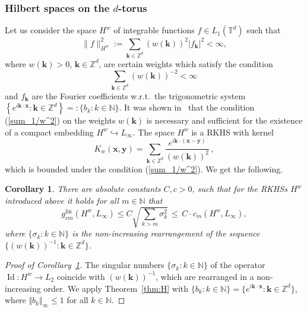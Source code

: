 \documentclass[a4paper,12pt]{amsart}
\newtheorem{corollary}[theorem]{Corollary}
\theoremstyle{definition}
\theoremstyle{remark}
\newcommand{\bk}{\mathbf{k}}
\newcommand{\bx}{\mathbf{x}}
\newcommand{\by}{\mathbf{y}}
\newcommand{\lin}{\ensuremath{\mathrm{lin}}}
\DeclareMathOperator{\Id}{Id}
\begin{document}
\subsubsection{Hilbert spaces on the $d$-torus}%
Let us consider the space $H^w$ of 
integrable 
functions $f\in L_1(\mathbb{T}^d)$ 
such that
\begin{displaymath}
	\| f \|^2_{H^w} :=	 \sum_{\bk\in \mathbb{Z}^d} (w(\bk))^2 | f_\bk |^2  
    < \infty,
\end{displaymath}
where $w(\bk)>0$, $\bk\in \mathbb{Z}^d$, are certain weights which satisfy the condition 
\begin{equation}\label{sum_1/w^2}
	\sum_{\bk\in \mathbb{Z}^d} (w(\bk))^{-2} < \infty \,
\end{equation}
and $f_\bk$ are the Fourier coefficients w.r.t.\ the trigonometric system
$\left\{ e^{i \bk \cdot \bx }\colon \bk \in \mathbb{Z}^d \right\} =: \{b_k \colon k\in \mathbb{N}\}$.
{It was shown in~\cite[Thm.~3.1]{CKS} that the condition (\ref{sum_1/w^2}) on the weights
$w(\bk)$ is necessary and sufficient for the existence of a compact embedding $H^w \hookrightarrow L_{\infty}$.
%
The space $H^w$ is a RKHS with kernel
\begin{equation*}%
	K_w(\bx, \by) = \sum_{ \bk\in \mathbb{Z}^d } \frac{ e^{i \bk \cdot (\bx - \by)}  }{ \left( w(\bk) \right)^2 }\,,
\end{equation*}
which is bounded under the condition (\ref{sum_1/w^2}).}
%
We get the following.



\begin{corollary}\label{SC_general_weights}
There are absolute constants
$C,c>0$,
such that for the RKHSs $H^w$ introduced above it holds for all $m\in \mathbb{N}$ that 
	$$
	g_{cm}^{\lin}( H^w, L_{\infty}) \leq  C \sqrt{ \sum\limits_{k>m}	\sigma_k^2}
	\,\le\, 
C\cdot c_{m}(H^w, L_{\infty}), 
	$$
where $\{\sigma_k \colon k \in \mathbb{N} \}$ is the non-increasing rearrangement of the sequence  $\{ (w(\bk))^{-1}\colon \bk \in \mathbb{Z}^d \}$.
\end{corollary}

\begin{proof}[Proof of Corollary~\ref{SC_general_weights}]
The singular numbers $\{\sigma_k \colon k \in \mathbb{N} \}$ of the operator 
$\Id \colon H^w \to L_{2}$ coincide with 
$(w(\bk))^{-1}$, which are rearranged in 
a non-increasing order.
We apply Theorem~\ref{thm:H} with
$\{ b_k \colon k \in \mathbb{N} \} = \{ e^{i \bk \cdot \bx }  \colon \bk \in \mathbb{Z}^d \}$,
where
$\Vert b_k  \Vert_\infty \leq 1$
for all $k\in\mathbb{N}$.
\end{proof}
\end{document}
